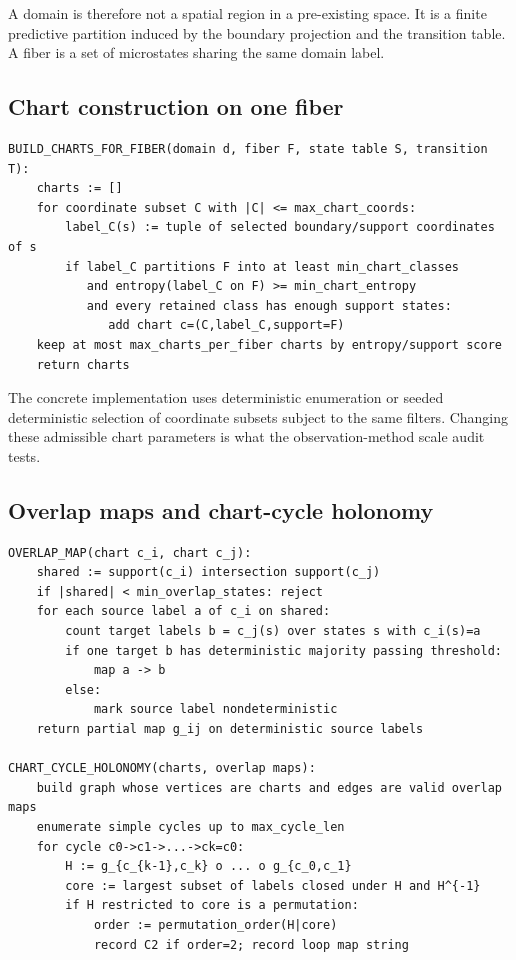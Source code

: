 \documentclass[11pt]{article}
\begin{document}
A domain is therefore not a spatial region in a pre-existing space.  It is a finite predictive partition induced by the boundary projection and the transition table.  A fiber is a set of microstates sharing the same domain label.

\subsection{Chart construction on one fiber}
\begin{lstlisting}
BUILD_CHARTS_FOR_FIBER(domain d, fiber F, state table S, transition T):
    charts := []
    for coordinate subset C with |C| <= max_chart_coords:
        label_C(s) := tuple of selected boundary/support coordinates of s
        if label_C partitions F into at least min_chart_classes
           and entropy(label_C on F) >= min_chart_entropy
           and every retained class has enough support states:
              add chart c=(C,label_C,support=F)
    keep at most max_charts_per_fiber charts by entropy/support score
    return charts
\end{lstlisting}

The concrete implementation uses deterministic enumeration or seeded deterministic selection of coordinate subsets subject to the same filters.  Changing these admissible chart parameters is what the observation-method scale audit tests.

\subsection{Overlap maps and chart-cycle holonomy}
\begin{lstlisting}
OVERLAP_MAP(chart c_i, chart c_j):
    shared := support(c_i) intersection support(c_j)
    if |shared| < min_overlap_states: reject
    for each source label a of c_i on shared:
        count target labels b = c_j(s) over states s with c_i(s)=a
        if one target b has deterministic majority passing threshold:
            map a -> b
        else:
            mark source label nondeterministic
    return partial map g_ij on deterministic source labels

CHART_CYCLE_HOLONOMY(charts, overlap maps):
    build graph whose vertices are charts and edges are valid overlap maps
    enumerate simple cycles up to max_cycle_len
    for cycle c0->c1->...->ck=c0:
        H := g_{c_{k-1},c_k} o ... o g_{c_0,c_1}
        core := largest subset of labels closed under H and H^{-1}
        if H restricted to core is a permutation:
            order := permutation_order(H|core)
            record C2 if order=2; record loop map string
\end{lstlisting}
\end{document}
